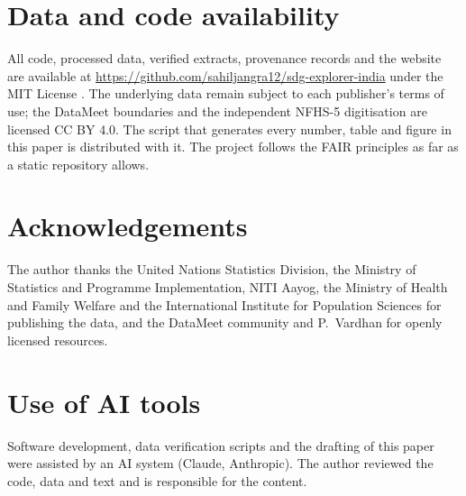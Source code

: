 \documentclass[11pt,a4paper]{article}
\begin{document}
\section*{Data and code availability}
All code, processed data, verified extracts, provenance records and the website are available at \url{https://github.com/sahiljangra12/sdg-explorer-india} under the MIT License \citep{sdgexplorer}. The underlying data remain subject to each publisher's terms of use; the DataMeet boundaries and the independent NFHS-5 digitisation are licensed CC BY 4.0. The script that generates every number, table and figure in this paper is distributed with it. The project follows the FAIR principles \citep{wilkinson2016fair} as far as a static repository allows.

\section*{Acknowledgements}
The author thanks the United Nations Statistics Division, the Ministry of Statistics and Programme Implementation, NITI Aayog, the Ministry of Health and Family Welfare and the International Institute for Population Sciences for publishing the data, and the DataMeet community and P.~Vardhan for openly licensed resources.

\section*{Use of AI tools}
Software development, data verification scripts and the drafting of this paper were assisted by an AI system (Claude, Anthropic). The author reviewed the code, data and text and is responsible for the content.

\FloatBarrier


\end{document}
